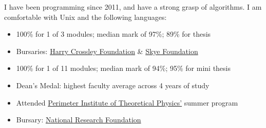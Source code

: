 \documentclass[10pt,a4paper,ragged2e,academicons]{altacv}
\begin{document}
\bigskip

I have been programming since 2011, and have a strong grasp of algorithms.
I am comfortable with Unix and the following languages:\\
\vspace{3mm}
%
\cvtag{\TeX{}}%


\pagebreak
\vspace{-1.39em}


\nocite{*}
\AtNextBibliography{\small}
\printbibliography[heading=pubtype,title={\printinfo{\faFileTextO}{Journal Articles}}, type=article]
\AtNextBibliography{\small}
\printbibliography[heading=pubtype,title={\printinfo{\faGraduationCap}{Theses}}, type=thesis]
\AtNextBibliography{\small}
\printbibliography[heading=pubtype,title={\printinfo{\faCommentsO}{Seminars \& Colloquia}}, type=misc]



\begin{itemize}
    \item 100\% for 1 of 3 modules; median mark of 97\%; 89\% for thesis
    \item Bursaries: \href{https://thecrossleyfoundation.co.za/}{Harry Crossley Foundation} \& \href{http://skyefoundation.co.za/awards/awards-by-year/}{Skye Foundation}
\end{itemize}

\begin{itemize}
    \item 100\% for 1 of 11 modules; median mark of 94\%; 95\% for mini thesis
    \item Dean's Medal: highest faculty average across 4 years of study
    \item Attended \href{https://perimeterinstitute.ca/}{Perimeter Institute of Theoretical Physics'} summer program
    \item Bursary: \href{https://www.nrf.ac.za/}{National Research Foundation}
\end{itemize}
\end{document}

